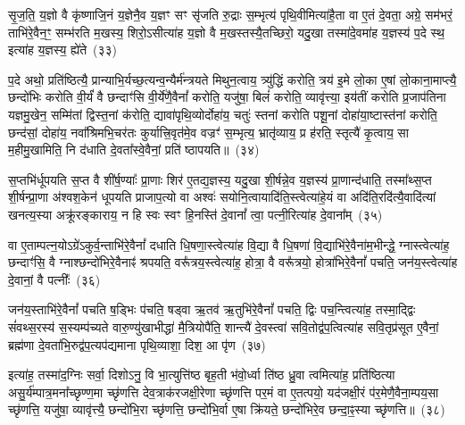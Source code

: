 सृ॒ज॒ति॒ य॒ज्ञो वै कृ॑ष्णाजि॒नं य॒ज्ञेनै॒व य॒ज्ञꣳ सꣳ सृ॑जति रु॒द्राः स॒म्भृत्य॑ पृथि॒वीमित्या॑है॒ता वा ए॒तं दे॒वता॒ अग्रे॒ सम॑भरं॒ ताभि॑रे॒वैन॒ꣳ॒ सम्भ॑रति म॒खस्य॒ शिरो॒\-ऽसीत्या॑ह य॒ज्ञो वै म॒खस्तस्यै॒तच्छिरो॒ यदु॒खा तस्मा॑दे॒वमा॑ह य॒ज्ञस्य॑ प॒दे स्थ॒ इत्या॑ह य॒ज्ञस्य॒ ह्ये॑ते~(३३)

प॒दे अथो॒ प्रति॑ष्ठित्यै॒ प्रान्याभि॒र्यच्छ॒त्यन्व॒न्यैर्म॑न्त्रयते मिथुन॒त्वाय॒ त्र्यु॑द्धिं करोति॒ त्रय॑ इ॒मे लो॒का ए॒षां लो॒काना॒माप्त्यै॒ छन्दो॑भिः करोति वी॒र्यं॑ वै छन्दाꣳ॑सि वी॒र्ये॑णै॒वैनां᳚ करोति॒ यजु॑षा॒ बिलं॑ करोति॒ व्यावृ॑त्त्या॒ इय॑तीं करोति प्र॒जाप॑तिना यज्ञमु॒खेन॒ सम्मि॑तां द्विस्त॒नां क॑रोति॒ द्यावा॑पृथि॒व्योर्दोहा॑य॒ चतुः॑ स्तनां करोति पशू॒नां दोहा॑या॒ष्टास्त॑नां करोति॒ छन्द॑सां॒ दोहा॑य॒ नवा᳚श्रिमभि॒चर॑तः कुर्यात्त्रि॒वृत॑मे॒व वज्रꣳ॑ स॒म्भृत्य॒ भ्रातृ॑व्याय॒ प्र ह॑रति॒ स्तृत्यै॑ कृ॒त्वाय॒ सा म॒हीमु॒खामिति॒ नि द॑धाति दे॒वता᳚स्वे॒वैनां॒ प्रति॑ ष्ठापयति॥~(३४)

{\anuvakamend[{तेनै॒व लोम॑भिः॒ समे॒ते अ॑भि॒चर॑त॒ एक॑विꣳशतिश्च}]}%

स॒प्तभि॑र्धूपयति स॒प्त वै शी॑र्\mbox{}ष॒ण्याः᳚ प्रा॒णाः शिर॑ ए॒तद्य॒ज्ञस्य॒ यदु॒खा शी॒र्\mbox{}षन्ने॒व य॒ज्ञस्य॑ प्रा॒णान्द॑धाति॒ तस्मा᳚थ्स॒प्त शी॒र्\mbox{}षन्प्रा॒णा अ॑श्वश॒केन॑ धूपयति प्राजाप॒त्यो वा अश्वः॑ सयोनि॒त्वायादि॑ति॒स्त्वेत्या॑हे॒यं वा अदि॑ति॒रदि॑त्यै॒वादि॑त्यां खनत्य॒स्या अक्रू॑रङ्काराय॒ न हि स्वः स्वꣳ हि॒नस्ति॑ दे॒वानां᳚ त्वा॒ पत्नी॒रित्या॑ह दे॒वाना᳚म्~(३५)

वा ए॒ताम्पत्न॒यो\-ऽग्रे॑\-ऽकुर्व॒न्ताभि॑रे॒वैनां᳚ दधाति धि॒षणा॒स्त्वेत्या॑ह वि॒द्या वै धि॒षणा॑ वि॒द्याभि॑रे॒वैना॑म॒भीन्द्धे॒ ग्नास्त्वेत्या॑ह॒ छन्दाꣳ॑सि॒ वै ग्नाश्छन्दो॑भिरे॒वैनाꣴ॑ श्रपयति॒ वरू᳚त्रय॒स्त्वेत्या॑ह॒ होत्रा॒ वै वरू᳚त्रयो॒ होत्रा॑भिरे॒वैनां᳚ पचति॒ जन॑य॒स्त्वेत्या॑ह दे॒वानां॒ वै पत्नीः᳚~(३६)

जन॑य॒स्ताभि॑रे॒वैनां᳚ पचति ष॒ड्भिः प॑चति॒ षड्वा ऋ॒तव॑ ऋ॒तुभि॑रे॒वैनां᳚ पचति॒ द्विः पच॒न्त्वित्या॑ह॒ तस्मा॒द्द्विः सं॑वथ्स॒रस्य॑ स॒स्यम्प॑च्यते वारु॒ण्यु॑खाभीद्धा॑ मै॒त्रियोपै॑ति॒ शान्त्यै॑ दे॒वस्त्वा॑ सवि॒तोद्व॑प॒त्वित्या॑ह सवि॒तृप्र॑सूत ए॒वैनां॒ ब्रह्म॑णा दे॒वता॑भि॒रुद्व॑प॒त्यप॑द्यमाना पृथि॒व्याशा॒ दिश॒ आ पृ॑ण~(३७)

इत्या॑ह॒ तस्मा॑द॒ग्निः सर्वा॒ दिशो\-ऽनु॒ वि भा॒त्युत्ति॑ष्ठ बृह॒ती भ॑वो॒र्ध्वा ति॑ष्ठ ध्रु॒वा त्वमित्या॑ह॒ प्रति॑ष्ठित्या असु॒र्य॑म्पात्र॒\-मना᳚च्छृण्ण॒मा च्छृ॑णत्ति देव॒त्राक॑रजक्षी॒रेणा च्छृ॑णत्ति पर॒मं वा ए॒तत्पयो॒ यद॑जक्षी॒रं प॑र॒मेणै॒वैना॒म्पय॒सा च्छृ॑णत्ति॒ यजु॑षा॒ व्यावृ॑त्त्यै॒ छन्दो॑भि॒रा च्छृ॑णत्ति॒ छन्दो॑भि॒र्वा ए॒षा क्रि॑यते॒ छन्दो॑भिरे॒व छन्दा॒ꣴ॒स्या च्छृ॑णत्ति॥~(३८)

